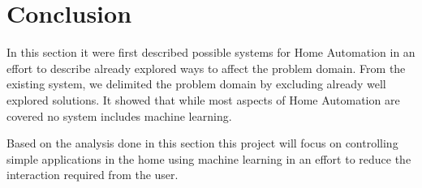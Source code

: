 \section{Conclusion}
In this section it were first described possible systems for Home Automation in an effort to describe already explored ways to affect the problem domain. From the existing system, we delimited the problem domain by excluding already well explored solutions. It showed that while most aspects of Home Automation are covered no system includes machine learning.

Based on the analysis done in this section this project will focus on controlling simple applications in the home using machine learning in an effort to reduce the interaction required from the user.
